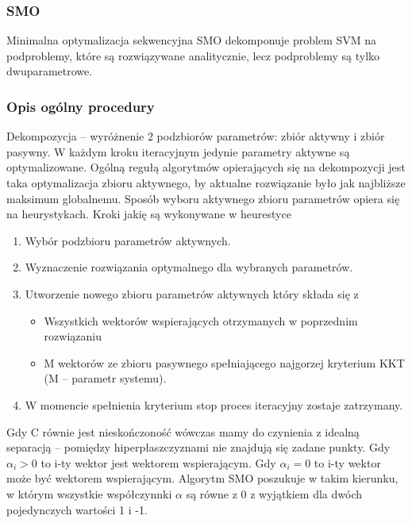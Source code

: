 \documentclass[[10pt,a4paper]{article}
\begin{document}
\subsubsection{SMO}
Minimalna optymalizacja sekwencyjna SMO dekomponuje problem SVM na podproblemy, które są rozwiązywane analitycznie, lecz podproblemy są tylko dwuparametrowe. 
\subsubsection{Opis ogólny procedury}
Dekompozycja – wyróżnenie 2 podzbiorów parametrów: zbiór aktywny i zbiór pasywny. W każdym kroku iteracyjnym jedynie parametry aktywne są optymalizowane. Ogólną regułą algorytmów opierających się na dekompozycji jest taka optymalizacja zbioru aktywnego, by aktualne rozwiązanie było jak najbliższe maksimum globalnemu. 
Sposób wyboru aktywnego zbioru parametrów opiera się na heurystykach.
\newline
\newline
Kroki jakię są wykonywane w heurestyce
\begin{enumerate}
\item Wybór podzbioru parametrów aktywnych. 
\item Wyznaczenie rozwiązania optymalnego dla wybranych parametrów.
\item Utworzenie nowego zbioru parametrów aktywnych który składa się z
\begin{itemize}
\item Wszystkich wektorów wspierających otrzymanych w poprzednim rozwiązaniu
\item M wektorów ze zbioru pasywnego spełniającego najgorzej kryterium KKT (M – parametr systemu). 
\end{itemize}
\item W momencie spełnienia kryterium stop proces iteracyjny zostaje zatrzymany. 
\end{enumerate}

Gdy C równie jest nieskończoność wówczas mamy do czynienia z idealną separacją – pomiędzy hiperpłaszczyznami nie znajdują się zadane punkty. 
Gdy $\alpha_{i} > 0 $ to i-ty wektor jest wektorem wspierającym.
Gdy $\alpha_{i} = 0 $ to i-ty wektor może być wektorem wspierającym.
\newline
Algorytm SMO poszukuje w takim kierunku, w którym wszystkie współczynnki $\alpha$ są równe z 0 z wyjątkiem dla dwóch pojedynczych wartości 1 i -1. 
\end{document}
